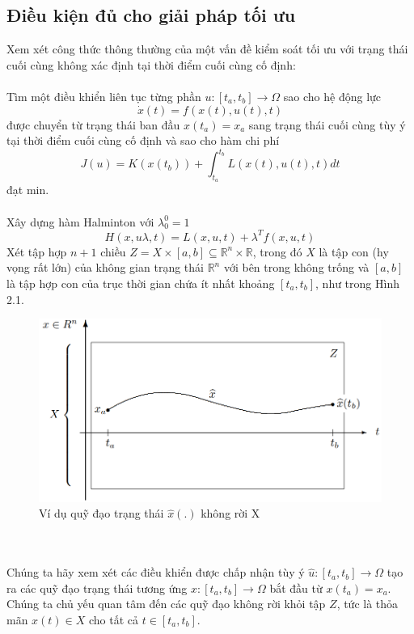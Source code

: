 \documentclass[12pt,a4paper]{report}
\begin{document}
	\subsection{Điều kiện đủ cho giải pháp tối ưu}
	Xem xét công thức thông thường của một vấn đề kiểm soát tối ưu với trạng thái cuối cùng không xác định tại thời điểm cuối cùng cố định: \\\\ Tìm một điều khiển liên tục từng phần $u : [t_a, t_b] \to \Omega$ sao cho hệ động lực $$\dot{x}(t) = f(x(t), u(t), t)$$ được chuyển từ trạng thái ban đầu $x(t_a) = x_a$ sang trạng thái cuối cùng tùy ý tại thời điểm cuối cùng cố định và sao cho hàm chi phí $$J(u) = K(x(t_b)) + \int_{t_a}^{t_b}L(x(t), u(t), t)dt$$ đạt min.\\\\
	Xây dựng hàm Halminton với $\lambda_0^0 = 1$ $$H(x, u \lambda, t) = L(x, u, t) + \lambda^Tf(x, u, t)$$
	Xét tập hợp $n + 1$ chiều $Z = X \times [a, b] \subseteq \mathbb{R}^n \times \mathbb{R}$, trong đó $X$ là tập con (hy vọng rất lớn) của không gian trạng thái $\mathbb{R}^n$ với bên trong không trống và $[a, b]$ là tập hợp con của trục thời gian chứa ít nhất khoảng $[t_a, t_b]$, như trong Hình 2.1.
	\begin{figure}[h]
		\centering
	  	\includegraphics[scale=.6]{hinh1ct.png}
		\caption{Ví dụ quỹ đạo trạng thái $\hat{x}(.)$ không rời X}
	\end{figure}\\\\
	Chúng ta hãy xem xét các điều khiển được chấp nhận tùy ý $\hat{u}: [t_a, t_b] \to \Omega$ tạo ra các quỹ đạo trạng thái tương ứng $\hat{x}: [t_a, t_b] \to \Omega$ bắt đầu từ $x(t_a) = x_a$. Chúng ta chủ yếu quan tâm đến các quỹ đạo không rời khỏi tập $Z$, tức là thỏa mãn $x(t) \in X$ cho tất cả $t \in [t_a, t_b]$. \\\\
\end{document}

